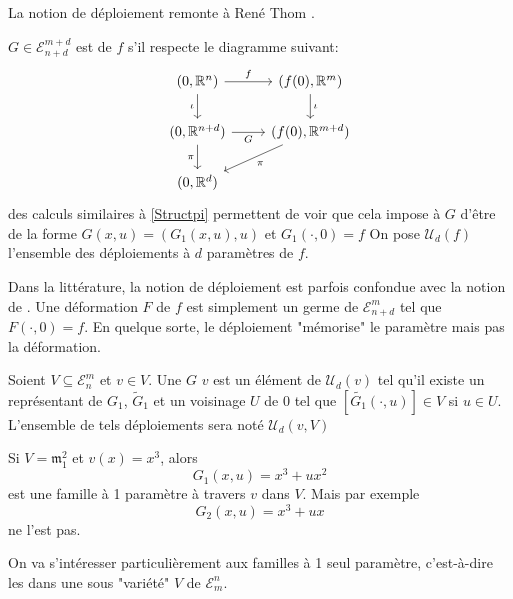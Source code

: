 \documentclass[memoire.tex]{subfiles}
\begin{document}
La notion de déploiement remonte à 
René Thom \cite{Thom1972Stabilite}.
\begin{definition} 
    $G\in \mathcal{E}_{n+d}^{m+d}$ est   de $f$
    s'il respecte le diagramme suivant:
    \[\begin{tikzcd}
	{(0,\R^n)} & {(f(0),\R^m)} \\
	{(0,\R^{n+d})} & {(f(0),\R^{m+d})} \\
	{(0,\R^d)}
	\arrow["f", from=1-1, to=1-2]
	\arrow["\iota"', from=1-1, to=2-1]
	\arrow["\iota", from=1-2, to=2-2]
	\arrow["G"', from=2-1, to=2-2]
	\arrow["\pi"', from=2-1, to=3-1]
	\arrow["\pi", from=2-2, to=3-1]
    \end{tikzcd}\]
    des calculs similaires à \ref{Structpi} permettent de voir que cela impose à $G$ d'être de la forme $G(x,u)=(G_1(x,u),u)$ et 
    $G_1(\cdot,0)=f$
    On pose $\mathcal{U}_d(f)$ l'ensemble des déploiements à $d$ paramètres de $f$.
\end{definition}

\begin{remarque}
    Dans la littérature, la notion de déploiement est parfois confondue avec la notion de . Une déformation $F$ de $f$ est simplement un germe  de $\mathcal{E}^{m}_{n+d}$ tel que $F(\cdot,0)=f$. En quelque sorte, le déploiement "mémorise" le paramètre mais pas la déformation.
\end{remarque}

\begin{definition}
    Soient $V\subseteq \mathcal{E}^m_n$  et $v\in V$. Une   $G$    $v$  est un élément de  $\mathcal{U}_d(v)$ tel qu'il existe un représentant de  $G_1$, $\tilde{G}_1$ et un voisinage $U$ de $0$ tel que $[\tilde{G_1}(\cdot,u)]\in V$ si $u\in U$. L'ensemble de tels déploiements sera noté $\mathcal{U}_d(v,V)$
\end{definition}

\begin{exemple}
    Si $V=\mathfrak{m}^2_1$ et $v(x)=x^3$, alors 
    \begin{equation*}
        G_1(x,u)=x^3+ux^2
    \end{equation*}
    est une famille à 1 paramètre à travers $v$ dans $V$. Mais par exemple 
    \begin{equation*}
        G_2(x,u)=x^3+ux
    \end{equation*}
    ne l'est pas.
\end{exemple}
On va s'intéresser particulièrement aux familles à 1 seul paramètre, c'est-à-dire les  dans une sous "variété"  $V$ de $\mathcal{E}^n_m$.
\end{document}
